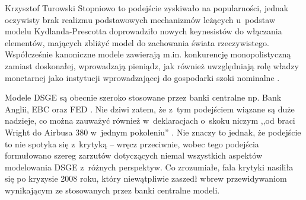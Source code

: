 \begin{artplenv}{Krzysztof Turowski}
Stopniowo to podejście zyskiwało na popularności, jednak oczywisty brak realizmu podstawowych mechanizmów
leżących u~podstaw modelu Kydlanda-Prescotta doprowadziło nowych keynesistów do włączania elementów, mających zbliżyć model do
zachowania świata rzeczywistego. Współcześnie kanoniczne modele zawierają m.in. konkurencję monopolistyczną zamiast
doskonałej, wprowadzają pieniądz, jak również uwzględniają rolę władzy monetarnej jako instytucji wprowadzającej do
gospodarki szoki nominalne
\parencite{fernandez-villaverde_econometrics_2010}.

Modele DSGE są obecnie szeroko stosowane przez banki centralne np. Bank Anglii, EBC oraz FED
\parencite{smets_dsge_2010,tovar_dsge_2009}.
Nie dziwi zatem, że z~tym podejściem wiązane są duże
nadzieje, co można zauważyć również w~deklaracjach o~skoku niczym ,,od braci Wright do Airbusa 380 w~jednym pokoleniu''
\parencite{fernandez-villaverde_econometrics_2010}.
Nie znaczy to jednak, że podejście to nie spotyka się z~krytyką
 --  wręcz przeciwnie, wobec tego podejścia formułowano szereg zarzutów dotyczących niemal wszystkich aspektów
modelowania DSGE z~różnych perspektyw. Co zrozumiałe, fala krytyki nasiliła się po kryzysie 2008 roku, który
niewątpliwie zaszedł wbrew przewidywaniom wynikającym ze stosowanych przez banki centralne modeli.


\end{artplenv}
